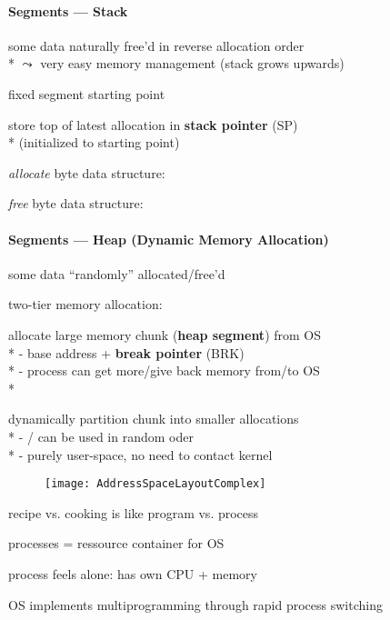 \paragraph{Segments --- Stack}
\begin{items}
	\item some data naturally free'd in reverse allocation order \\*
		\( \leadsto \) very easy memory management (stack grows upwards)
	\item fixed segment starting point
	\item store top of latest allocation in \textbf{stack pointer} (SP) \\*
		(initialized to starting point)
	\item \emph{allocate}  byte data structure: 
	\item \emph{free}  byte data structure: 
\end{items}

\paragraph{Segments --- Heap (Dynamic Memory Allocation)}
\begin{items}
	\item some data "`randomly"' allocated/free'd
	\item two-tier memory allocation:
	\begin{enumeration}
		\item allocate large memory chunk (\textbf{heap segment}) from OS \\*
			- base address + \textbf{break pointer} (BRK) \\*
			- process can get more/give back memory from/to OS \\*
		\item dynamically partition chunk into smaller allocations \\*
			- / can be used in random oder \\*
			- purely user-space, no need to contact kernel
	\end{enumeration}
\end{items}

\begin{figure}[H]\centering\label{AddressSpaceLayoutComplex}\texttt{[image: AddressSpaceLayoutComplex]}\end{figure}

\begin{summary}
	\item recipe vs. cooking is like program vs. process
	\item processes = ressource container for OS
	\item process feels alone: has own CPU + memory
	\item OS implements multiprogramming through rapid process switching
\end{summary}